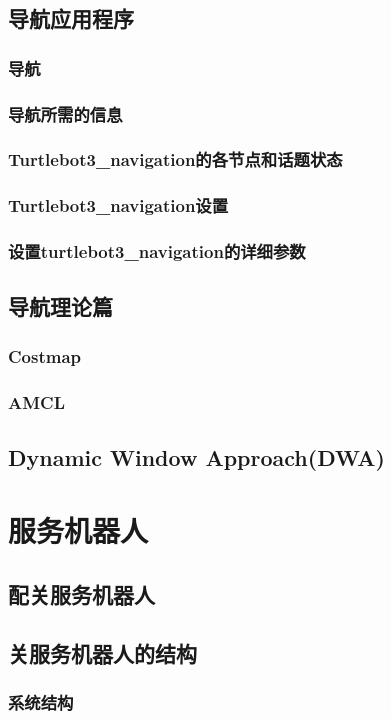 \documentclass[geye,green,kindle,cn]{elegantnote}
\begin{document}
\subsection{导航应用程序}
\subsubsection{导航}
\subsubsection{导航所需的信息}
\subsubsection{Turtlebot3\_navigation的各节点和话题状态}
\subsubsection{Turtlebot3\_navigation设置}
\subsubsection{设置turtlebot3\_navigation的详细参数}
\subsection{导航理论篇}
\subsubsection{Costmap}
\subsubsection{AMCL}
\subsection{Dynamic Window Approach(DWA)}
\section{服务机器人}
\subsection{配关服务机器人}
\subsection{关服务机器人的结构}
\subsubsection{系统结构}
\end{document}
